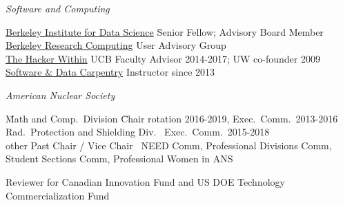 \vspace*{-.4em}
\textit{Software and Computing}
\vspace*{-.4em}
\begin{tabbing}
\hspace*{1 em}\=\href{http://bids.berkeley.edu/}{Berkeley Institute for Data Science} \hspace*{2.5 em}\= Senior Fellow; Advisory Board Member\\
%
\>\href{http://research-it.berkeley.edu/programs/berkeley-research-computing}{Berkeley Research Computing} \> User Advisory Group\\
%
%
\> \href{http://thehackerwithin.github.io/berkeley/}{The Hacker Within}  \> UCB Faculty Advisor 2014-2017; UW co-founder 2009\\
%
\> \href{http://software-carpentry.org/}{Software \& Data Carpentry}  \> Instructor since 2013%
%
\end{tabbing}
%
\vspace*{-.4em}
\textit{American Nuclear Society}
\vspace*{-.5em}
\begin{tabbing}
\hspace*{1 em}\= Math and Comp.\ Division \hspace*{6em} \= Chair rotation 2016-2019, Exec.\ Comm.\ 2013-2016 \\
%
\> Rad.\ Protection and Shielding Div.\ \> Exec.\ Comm.\ 2015-2018\\
%
%
\> other Past Chair / Vice Chair\ \> NEED Comm, Professional Divisions Comm, \\ \> \> Student Sections Comm, Professional Women in ANS %
%
%
%
%
%
\end{tabbing}

\vspace*{-.4em}

Reviewer for Canadian Innovation Fund and US DOE Technology Commercialization Fund




